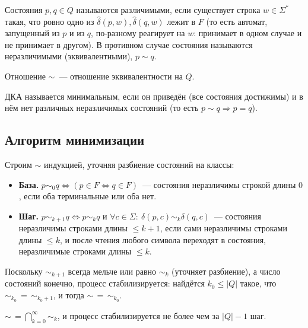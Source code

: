 \documentclass[12pt]{article}
\begin{document}
	\begin{definition}
		Состояния $p, q \in Q$ называются различимыми, если существует строка $w \in \Sigma^*$ такая, что ровно одно из $\hat\delta(p, w), \hat\delta(q, w)$ лежит в $F$ (то есть автомат, запущенный из $p$ и из $q$, по-разному реагирует на $w$: принимает в одном случае и не принимает в другом). В противном случае состояния называются неразличимыми (эквивалентными), $p \sim q$.
	\end{definition}
	
	\begin{statement}
		Отношение $\sim$~--- отношение эквивалентности на $Q$.
	\end{statement}
	
	\begin{definition}
		ДКА называется минимальным, если он приведён (все состояния достижимы) и в нём нет различных неразличимых состояний (то есть $p \sim q \Rightarrow p = q$).
	\end{definition}
	
	\subsection{Алгоритм минимизации}
	
	Строим $\sim$ индукцией, уточняя разбиение состояний на классы:
	
	\begin{itemize}
		\item \textbf{База.} $p \sim_0 q \Leftrightarrow (p \in F \Leftrightarrow q \in F)$~--- состояния неразличимы строкой длины $0$, если оба терминальные или оба нет.
		\item \textbf{Шаг.} $p \sim_{k+1} q \Leftrightarrow p \sim_k q$ и $\forall c \in \Sigma:\ \delta(p, c) \sim_k \delta(q, c)$~--- состояния неразличимы строками длины $\leqslant k+1$, если сами неразличимы строками длины $\leqslant k$, и после чтения любого символа переходят в состояния, неразличимые строками длины $\leqslant k$.
	\end{itemize}
	
	Поскольку $\sim_{k+1}$ всегда мельче или равно $\sim_k$ (уточняет разбиение), а число состояний конечно, процесс стабилизируется: найдётся $k_0 \leqslant |Q|$ такое, что $\sim_{k_0} \, = \, \sim_{k_0 + 1}$, и тогда $\sim \, = \, \sim_{k_0}$.
	
	\begin{statement}
		$\sim \, = \bigcap\limits_{k = 0}^\infty \sim_k$, и процесс стабилизируется не более чем за $|Q| - 1$ шаг.
	\end{statement}
	
\end{document}
